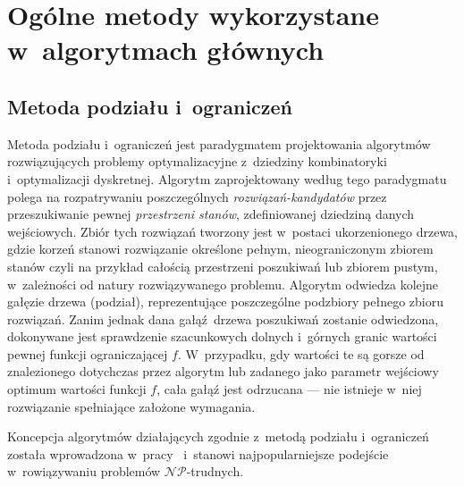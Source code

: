 \section{Ogólne metody wykorzystane w~algorytmach głównych}\label{s_methods}

\subsection{Metoda podziału i~ograniczeń}\label{ss_branch_and_bound}
\par{
  Metoda podziału i~ograniczeń jest paradygmatem projektowania algorytmów rozwiązujących problemy optymalizacyjne z~dziedziny kombinatoryki i~optymalizacji dyskretnej.
  Algorytm zaprojektowany według tego paradygmatu polega na rozpatrywaniu poszczególnych \emph{rozwiązań-kandydatów} przez przeszukiwanie pewnej \emph{przestrzeni stanów}, zdefiniowanej dziedziną danych wejściowych.
  Zbiór tych rozwiązań tworzony jest w~postaci ukorzenionego drzewa, gdzie korzeń stanowi rozwiązanie określone pełnym, nieograniczonym zbiorem stanów czyli na przykład całością przestrzeni poszukiwań lub zbiorem pustym, w~zależności od natury rozwiązywanego problemu.
  Algorytm odwiedza kolejne gałęzie drzewa (podział), reprezentujące poszczególne
  podzbiory pełnego zbioru rozwiązań.
  Zanim jednak dana gałąź~drzewa poszukiwań zostanie odwiedzona, dokonywane jest sprawdzenie szacunkowych dolnych i~górnych granic wartości pewnej funkcji ograniczającej $f$.
  W~przypadku, gdy wartości te są gorsze od znalezionego dotychczas przez algorytm lub zadanego jako parametr wejściowy optimum wartości funkcji $f$, cała gałąź jest odrzucana --- nie istnieje w~niej rozwiązanie spełniające założone wymagania.
}
\par{
  Koncepcja algorytmów działających zgodnie z~metodą podziału i~ograniczeń została wprowadzona w~pracy~\cite{land60} i~stanowi najpopularniejsze podejście w~rowiązywaniu problemów $\mathcal{NP}$-trudnych.
}
